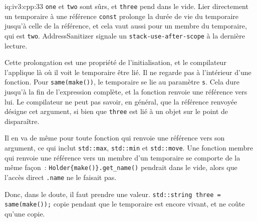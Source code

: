 \begin{solution}{iq:iv3:cpp:33}
\texttt{one} et \texttt{two} sont sûrs, et \texttt{three} pend dans le vide. Lier directement un temporaire à une référence \texttt{const} prolonge la durée de vie du temporaire jusqu'à celle de la référence, et cela vaut aussi pour un membre du temporaire, qui est \texttt{two}. AddressSanitizer signale un \texttt{stack-use-after-scope} à la dernière lecture.

Cette prolongation est une propriété de l'initialisation, et le compilateur l'applique là où il voit le temporaire être lié. Il ne regarde pas à l'intérieur d'une fonction. Pour \texttt{same(make())}, le temporaire se lie au paramètre \texttt{s}. Cela dure jusqu'à la fin de l'expression complète, et la fonction renvoie une référence vers lui. Le compilateur ne peut pas savoir, en général, que la référence renvoyée désigne cet argument, si bien que \texttt{three} est lié à un objet sur le point de disparaître.

Il en va de même pour toute fonction qui renvoie une référence vers son argument, ce qui inclut \texttt{std::max}, \texttt{std::min} et \texttt{std::move}. Une fonction membre qui renvoie une référence vers un membre d'un temporaire se comporte de la même façon~: \texttt{Holder\{make()\}.get\_name()} pendrait dans le vide, alors que l'accès direct \texttt{.name} ne le faisait pas.

Donc, dans le doute, il faut prendre une valeur. \texttt{std::string three = same(make());} copie pendant que le temporaire est encore vivant, et ne coûte qu'une copie.

\end{solution}

